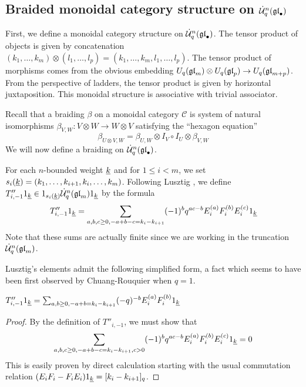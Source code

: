 \documentclass[11pt]{amsart}
\begin{document}
\subsection{Braided monoidal category structure on $\dot{{\mathcal{U}}}_q^n({\mathfrak{gl}}_\bullet)$} \label{se:braiding}
First, we define a monoidal category structure on $\dot{{\mathcal{U}}}_q^n({\mathfrak{gl}}_\bullet)$.  The tensor product of objects is given by concatenation $(k_1, \dots, k_m) \otimes (l_1, \dots, l_p) = (k_1, \dots, k_m, l_1, \dots, l_p) $.  The tensor product of morphisms comes from the obvious embedding $ U_q({\mathfrak{gl}}_{m}) \otimes U_q({\mathfrak{gl}}_{p}) \rightarrow U_q({\mathfrak{gl}}_{m+p})$.  From the perspective of ladders, the tensor product is given by horizontal juxtaposition.  This monoidal structure is associative with trivial associator.

Recall that a braiding $\beta$ on a monoidal category $ \mathcal C$ is system of natural isomorphisms $\beta_{V, W} : V \otimes W \rightarrow W \otimes V $ satisfying the ``hexagon equation''
\begin{equation} \label{eq:hex}
\beta_{U \otimes V, W} = \beta_{U, W}  \otimes I_V \circ I_U \otimes \beta_{V, W}
\end{equation}
We will now define a braiding on $ \dot{{\mathcal{U}}}_q^n({\mathfrak{gl}}_\bullet) $.

For each $n$-bounded weight $ {\underline{k}} $ and for $ 1 \le i < m $, we set $ s_i({\underline{k}}) = (k_1, \dots, k_{i+1}, k_i, \dots, k_m) $.  Following Lusztig \cite[5.2.1]{MR1227098}, we define $ T''_{i,-1} 1_{{\underline{k}}} \in 1_{s_i({\underline{k}})} \dot{{\mathcal{U}}}_q^n({\mathfrak{gl}}_m) 1_{{\underline{k}}} $ by the formula
\begin{equation}\label{eq:temp3}
T''_{i,-1} 1_{{\underline{k}}} = \sum_{a, b, c \ge 0, -a +b -c = k_i - k_{i+1}} (-1)^b q^{ac - b} E_i^{(a)} F_i^{(b)} E_i^{(c)} 1_{{\underline{k}}}
\end{equation}
Note that these sums are actually finite since we are working in the truncation $ \dot{{\mathcal{U}}}_q^n({\mathfrak{gl}}_m) $.


Lusztig's elements admit the following simplified form, a fact which seems to have been first observed by Chuang-Rouquier \cite{MR2373155} when $ q = 1 $.
\begin{lem} \label{le:singlesum}
$T''_{i,-1} 1_{{\underline{k}}} = \sum_{a, b \ge 0, -a +b = k_i - k_{i+1}} (-q)^{-b} E_i^{(a)} F_i^{(b)} 1_{{\underline{k}}} $
\end{lem}
\begin{proof}
By the definition of $ T''_{i,-1}$, we must show that 
$$\sum_{a, b, c \ge 0, -a +b -c = k_i - k_{i+1}, c > 0 } (-1)^b q^{ac - b} E_i^{(a)} F_i^{(b)} E_i^{(c)} 1_{{\underline{k}}} = 0 $$
This is easily proven by direct calculation starting with the usual commutation relation $ (E_i F_i - F_i E_i)1_{{\underline{k}}} = [k_i - k_{i+1}]_q $.
\end{proof}
\end{document}
